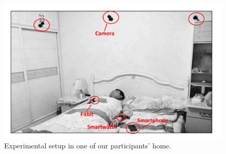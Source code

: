 \begin{figure}[!t]
	\centering
	\includegraphics[width=0.75\linewidth]{Figures/setup.pdf}
	\caption{Experimental setup in one of our participants' home. }\label{fig:setup}
\end{figure}







